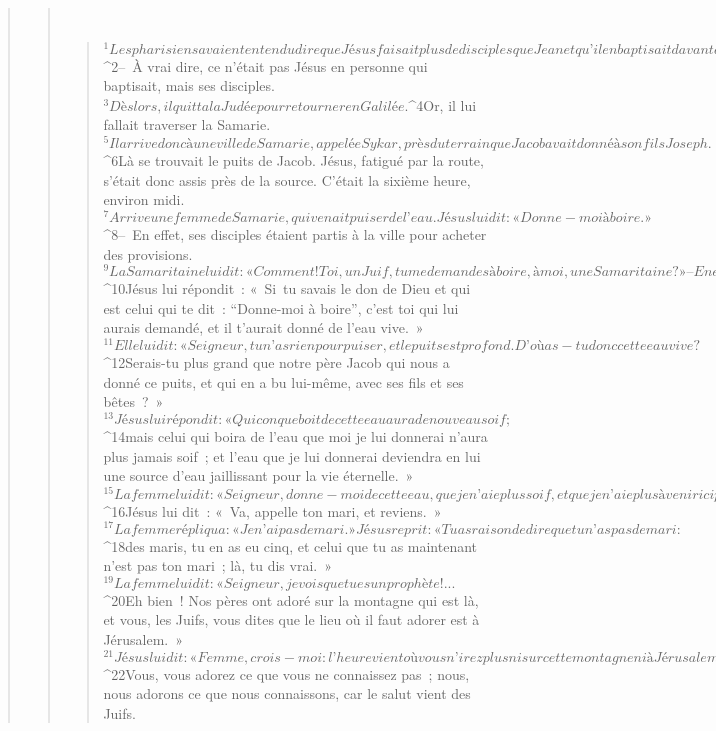 \begin{verse}
\begin{verse}
         
      \bchapter{}
      \begin{verse}
${}^{1}Les pharisiens avaient entendu dire que Jésus faisait plus de disciples que Jean et qu’il en baptisait davantage. Jésus lui-même en eut connaissance. 
${}^{2}– À vrai dire, ce n’était pas Jésus en personne qui baptisait, mais ses disciples. 
${}^{3}Dès lors, il quitta la Judée pour retourner en Galilée.
${}^{4}Or, il lui fallait traverser la Samarie. 
${}^{5}Il arrive donc à une ville de Samarie, appelée Sykar, près du terrain que Jacob avait donné à son fils Joseph. 
${}^{6}Là se trouvait le puits de Jacob. Jésus, fatigué par la route, s’était donc assis près de la source. C’était la sixième heure, environ midi.
${}^{7}Arrive une femme de Samarie, qui venait puiser de l’eau. Jésus lui dit : « Donne-moi à boire. » 
${}^{8}– En effet, ses disciples étaient partis à la ville pour acheter des provisions. 
${}^{9}La Samaritaine lui dit : « Comment ! Toi, un Juif, tu me demandes à boire, à moi, une Samaritaine ? » – En effet, les Juifs ne fréquentent pas les Samaritains.
${}^{10}Jésus lui répondit : « Si tu savais le don de Dieu et qui est celui qui te dit : “Donne-moi à boire”, c’est toi qui lui aurais demandé, et il t’aurait donné de l’eau vive. » 
${}^{11}Elle lui dit : « Seigneur, tu n’as rien pour puiser, et le puits est profond. D’où as-tu donc cette eau vive ? 
${}^{12}Serais-tu plus grand que notre père Jacob qui nous a donné ce puits, et qui en a bu lui-même, avec ses fils et ses bêtes ? » 
${}^{13}Jésus lui répondit : « Quiconque boit de cette eau aura de nouveau soif ; 
${}^{14}mais celui qui boira de l’eau que moi je lui donnerai n’aura plus jamais soif ; et l’eau que je lui donnerai deviendra en lui une source d’eau jaillissant pour la vie éternelle. » 
${}^{15}La femme lui dit : « Seigneur, donne-moi de cette eau, que je n’aie plus soif, et que je n’aie plus à venir ici pour puiser. »
${}^{16}Jésus lui dit : « Va, appelle ton mari, et reviens. » 
${}^{17}La femme répliqua : « Je n’ai pas de mari. » Jésus reprit : « Tu as raison de dire que tu n’as pas de mari : 
${}^{18}des maris, tu en as eu cinq, et celui que tu as maintenant n’est pas ton mari ; là, tu dis vrai. » 
${}^{19}La femme lui dit : « Seigneur, je vois que tu es un prophète !... 
${}^{20}Eh bien ! Nos pères ont adoré sur la montagne qui est là, et vous, les Juifs, vous dites que le lieu où il faut adorer est à Jérusalem. » 
${}^{21}Jésus lui dit : « Femme, crois-moi : l’heure vient où vous n’irez plus ni sur cette montagne ni à Jérusalem pour adorer le Père. 
${}^{22}Vous, vous adorez ce que vous ne connaissez pas ; nous, nous adorons ce que nous connaissons, car le salut vient des Juifs. 

\end{verse}
\end{verse}
\end{verse}
